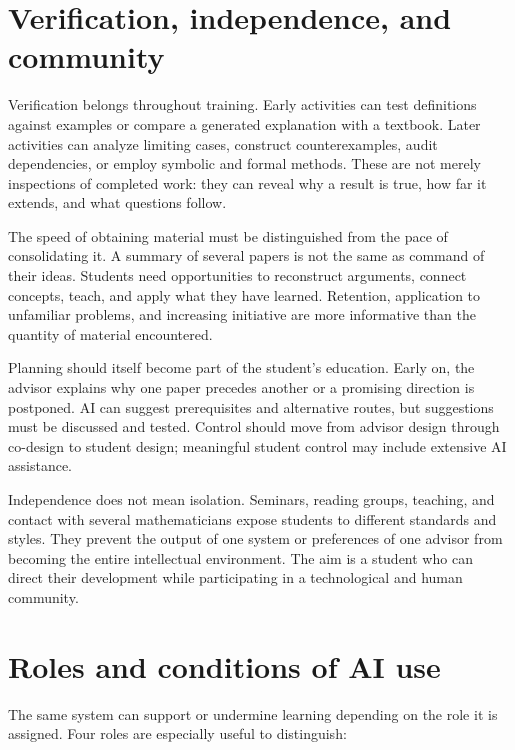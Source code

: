 \documentclass[11pt]{article}
\begin{document}
\section{Verification, independence, and community}

Verification belongs throughout training. Early activities can test definitions against
examples or compare a generated explanation with a textbook. Later activities can
analyze limiting cases, construct counterexamples, audit dependencies, or employ
symbolic and formal methods. These are not merely inspections of completed work:
they can reveal why a result is true, how far it extends, and what questions follow.

The speed of obtaining material must be distinguished from the pace of consolidating
it. A summary of several papers is not the same as command of their ideas. Students
need opportunities to reconstruct arguments, connect concepts, teach, and apply what
they have learned. Retention, application to unfamiliar problems, and increasing initiative are more informative
than the quantity of material encountered.

Planning should itself become part of the student's education. Early on, the advisor
explains why one paper precedes another or a promising direction is postponed. AI can
suggest prerequisites and alternative routes, but suggestions must be discussed and
tested. Control should move from advisor design through co-design to student design;
meaningful student control may include extensive AI assistance.

Independence does not mean isolation. Seminars, reading groups, teaching, and contact
with several mathematicians expose students to different standards and styles. They
prevent the output of one system or preferences of one advisor from becoming the entire
intellectual environment. The aim is a student who can direct their development while
participating in a technological and human community.

\section{Roles and conditions of AI use}
\label{sec:ai-roles-conditions}

The same system can support or undermine learning depending on the role it is assigned.
Four roles are especially useful to distinguish:
\end{document}
